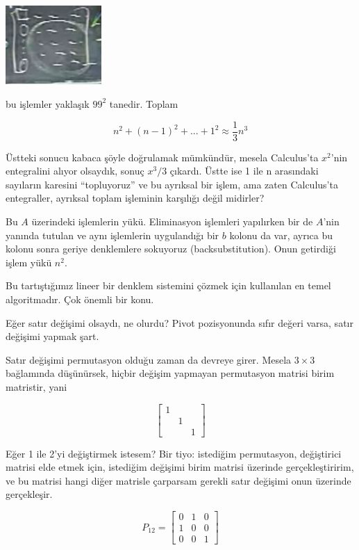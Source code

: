 \documentclass[12pt,fleqn]{article}\usepackage{../../common}
\begin{document}
\includegraphics[height=3cm]{02.png}

bu işlemler yaklaşık $99^2$ tanedir. Toplam

$$ n^2 + (n-1)^2 + ... + 1^2 \approx \frac{ 1}{3} n^3 $$

Üstteki sonucu kabaca şöyle doğrulamak mümkündür, mesela Calculus'ta
$x^2$'nin entegralini alıyor olsaydık, sonuç $x^3/3$ çıkardı. Üstte ise 1
ile n arasındaki sayıların karesini ``topluyoruz'' ve bu ayrıksal bir
işlem, ama zaten Calculus'ta entegraller, ayrıksal toplam işleminin
karşılığı değil midirler?

Bu $A$ üzerindeki işlemlerin yükü. Eliminasyon işlemleri yapılırken bir de
$A$'nin yanında tutulan ve aynı işlemlerin uygulandığı bir $b$ kolonu da
var, ayrıca bu kolonu sonra geriye denklemlere sokuyoruz
(backsubstitution). Onun getirdiği işlem yükü $n^2$.

Bu tartıştığımız lineer bir denklem sistemini çözmek için kullanılan en
temel algoritmadır. Çok önemli bir konu. 

Eğer satır değişimi olsaydı, ne olurdu? Pivot pozisyonunda sıfır değeri
varsa, satır değişimi yapmak şart. 

Satır değişimi permutasyon olduğu zaman da devreye girer. Mesela $3 \times
3$ bağlamında düşünürsek, hiçbir değişim yapmayan permutasyon matrisi birim
matristir, yani 

$$ 
\left[\begin{array}{rrr}
1 && \\
 & 1 & \\
 && 1
\end{array}\right]
 $$

Eğer 1 ile 2'yi değiştirmek istesem? Bir tiyo: istediğim permutasyon,
değiştirici matrisi elde etmek için, istediğim değişimi birim
matrisi üzerinde gerçekleştiririm, ve bu matrisi hangi diğer matrisle
çarparsam gerekli satır değişimi onun üzerinde gerçekleşir. 

$$ P_{12} = 
\left[\begin{array}{rrr}
0 & 1 & 0\\
1 & 0 & 0 \\
0  & 0 & 1
\end{array}\right]
 $$
\end{document}
